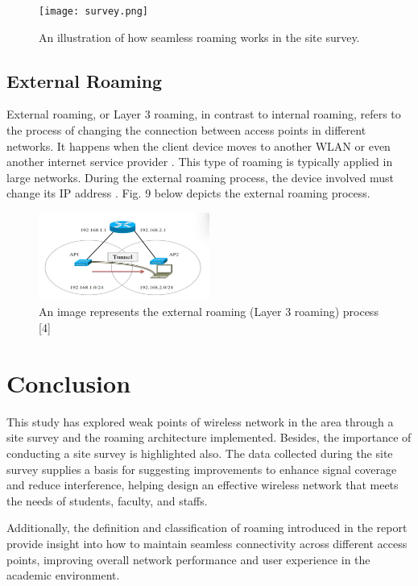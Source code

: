\documentclass[conference]{IEEEtran}
\begin{document}
\begin{figure}[htbp]
    \centering
    \texttt{[image: survey.png]}
    \caption{An illustration of how seamless roaming works in the site survey.}
\end{figure}


\subsection{External Roaming}

External roaming, or Layer 3 roaming, in contrast to internal roaming, refers to the process of changing the connection between access points in different networks. It happens when the client device moves to another WLAN or even another internet service provider \cite{article_example}. This type of roaming is typically applied in large networks. During the external roaming process, the device involved must change its IP address \cite{article_example}. Fig. 9 below depicts the external roaming process.

\begin{figure}
    \centering
    \includegraphics[width=0.5\textwidth]{fig9.png}
    \caption{An image represents the external roaming (Layer 3 roaming) process [4]}
    \label{fig:enter-label}
\end{figure}

\section{Conclusion}
This study has explored weak points of wireless network in the area through a site survey and the roaming architecture implemented. Besides, the importance of conducting a site survey is highlighted also. The data collected during the site survey supplies a basis for suggesting improvements to enhance signal coverage and reduce interference, helping design an effective wireless network that meets the needs of students, faculty, and staffs.

Additionally, the definition and classification of roaming introduced in the report provide insight into how to maintain seamless connectivity across different access points, improving overall network performance and user experience in the academic environment.



\end{document}
